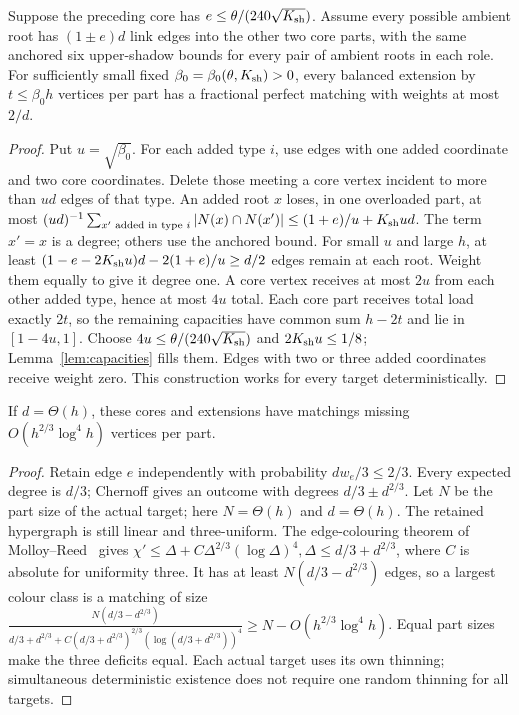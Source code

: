 \begin{lemma}\label{lem:extension}
Suppose the preceding core has $e\le\theta/(240\sqrt{K_{\rm{}sh}})$. Assume every possible ambient root has $(1\pm{}e)d$ link edges into the other two core parts, with the same anchored six upper-shadow
bounds for every pair of ambient roots in each role.  For sufficiently
small fixed $\beta_0=\beta_0(\theta,K_{\rm{}sh})>0$, every balanced extension by $t\le\beta_0h$ vertices per part has a fractional perfect matching with weights at most $2/d$.
\end{lemma}
\begin{proof}
Put $u=\sqrt{\beta_0}$.  For each added type $i$, use edges with one added coordinate and two core coordinates.  Delete those meeting
a core vertex incident to more than $ud$ edges of that type. An added root $x$ loses, in one overloaded part, at most $(ud)^{-1}\sum_{x'\text{ added in type }i}|N(x)\cap{}N(x')|\le(1+e)/u+K_{\rm{}sh}ud$. The term $x'=x$ is a degree; others use the anchored bound. For small $u$ and large $h$, at least $(1-e-2K_{\rm{}sh}u)d-2(1+e)/u\ge{}d/2$ edges remain at each root. Weight them equally to give it degree one.  A core vertex receives
at most $2u$ from each other added type, hence at most $4u$ total. Each core part receives total load exactly $2t$, so the remaining capacities have common sum $h-2t$ and lie in $[1-4u,1]$. Choose $4u\le\theta/(240\sqrt{K_{\rm{}sh}})$ and $2K_{\rm{}sh}u\le1/8$; Lemma~\ref{lem:capacities} fills them. Edges with two or three added coordinates receive weight zero.
This construction works for every target deterministically.
\end{proof}

\begin{corollary}[Rounding]\label{cor:rounding}
If $d=\Theta(h)$, these cores and extensions have matchings missing $O(h^{2/3}\log^4h)$ vertices per part.
\end{corollary}
\begin{proof}
Retain edge $e$ independently with probability $dw_e/3\le2/3$. Every expected degree is $d/3$; Chernoff gives an outcome with degrees $d/3\pm{}d^{2/3}$. Let $N$ be the part size of the actual target; here $N=\Theta(h)$ and $d=\Theta(h)$. The retained hypergraph is still linear and three-uniform. The edge-colouring
theorem of Molloy--Reed~\cite{MolloyReed} gives $\chi'\le\Delta+C\Delta^{2/3}(\log\Delta)^4,\Delta\le{}d/3+d^{2/3}$, where $C$ is absolute for uniformity three. It has at least $N(d/3-d^{2/3})$ edges, so a largest colour class is a matching of size $\frac{N(d/3-d^{2/3})}{d/3+d^{2/3}+C(d/3+d^{2/3})^{2/3}(\log(d/3+d^{2/3}))^4}\ge{}N-O(h^{2/3}\log^4h)$. Equal part sizes make the three deficits equal. Each actual target
uses its own thinning; simultaneous deterministic existence does not
require one random thinning for all targets.
\end{proof}

